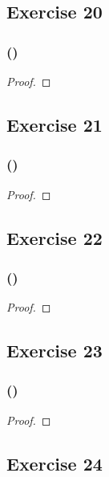 \documentclass[14pt]{extarticle}
\begin{document}
\subsection{Exercise 20}

\subsubsection{()}

\begin{proof}

\end{proof}

\subsection{Exercise 21}

\subsubsection{()}

\begin{proof}

\end{proof}

\subsection{Exercise 22}

\subsubsection{()}

\begin{proof}

\end{proof}

\subsection{Exercise 23}

\subsubsection{()}

\begin{proof}

\end{proof}

\subsection{Exercise 24}
\end{document}
